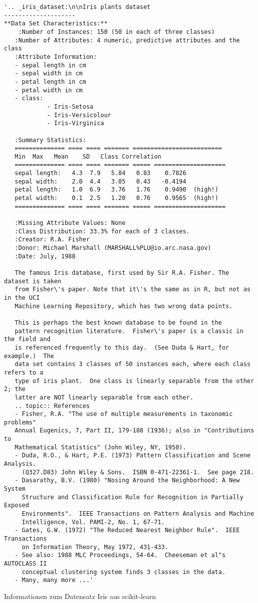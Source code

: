\begin{code}
\begin{lstlisting}[numbers=none]
'.. _iris_dataset:\n\nIris plants dataset
--------------------
**Data Set Characteristics:**
    :Number of Instances: 150 (50 in each of three classes)
   :Number of Attributes: 4 numeric, predictive attributes and the class
   :Attribute Information:
   - sepal length in cm
   - sepal width in cm
   - petal length in cm
   - petal width in cm
   - class:
            - Iris-Setosa
            - Iris-Versicolour
            - Iris-Virginica
            
   :Summary Statistics:
   ============== ==== ==== ======= =========================
   Min  Max   Mean    SD   Class Correlation
   ============== ==== ==== ======= ===== ====================
   sepal length:   4.3  7.9   5.84   0.83    0.7826
   sepal width:    2.0  4.4   3.05   0.43   -0.4194
   petal length:   1.0  6.9   3.76   1.76    0.9490  (high!)
   petal width:    0.1  2.5   1.20   0.76    0.9565  (high!)
   ============== ==== ==== ======= ===== ====================
       
   :Missing Attribute Values: None
   :Class Distribution: 33.3% for each of 3 classes.
   :Creator: R.A. Fisher
   :Donor: Michael Marshall (MARSHALL%PLU@io.arc.nasa.gov)
   :Date: July, 1988
       
   The famous Iris database, first used by Sir R.A. Fisher. The dataset is taken
   from Fisher\'s paper. Note that it\'s the same as in R, but not as in the UCI
   Machine Learning Repository, which has two wrong data points.
       
   This is perhaps the best known database to be found in the
   pattern recognition literature.  Fisher\'s paper is a classic in the field and
   is referenced frequently to this day.  (See Duda & Hart, for example.)  The
   data set contains 3 classes of 50 instances each, where each class refers to a
   type of iris plant.  One class is linearly separable from the other 2; the
   latter are NOT linearly separable from each other.
   .. topic:: References
   - Fisher, R.A. "The use of multiple measurements in taxonomic problems"
   Annual Eugenics, 7, Part II, 179-188 (1936); also in "Contributions to
   Mathematical Statistics" (John Wiley, NY, 1950).
   - Duda, R.O., & Hart, P.E. (1973) Pattern Classification and Scene Analysis.
     (Q327.D83) John Wiley & Sons.  ISBN 0-471-22361-1.  See page 218.
   - Dasarathy, B.V. (1980) "Nosing Around the Neighborhood: A New System
     Structure and Classification Rule for Recognition in Partially Exposed
     Environments".  IEEE Transactions on Pattern Analysis and Machine
     Intelligence, Vol. PAMI-2, No. 1, 67-71.
   - Gates, G.W. (1972) "The Reduced Nearest Neighbor Rule".  IEEE Transactions
     on Information Theory, May 1972, 431-433.
   - See also: 1988 MLC Proceedings, 54-64.  Cheeseman et al"s AUTOCLASS II
     conceptual clustering system finds 3 classes in the data.
   - Many, many more ...'
\end{lstlisting}
\caption{Informationen zum Datensatz Iris aus scikit-learn}
\end{code}


